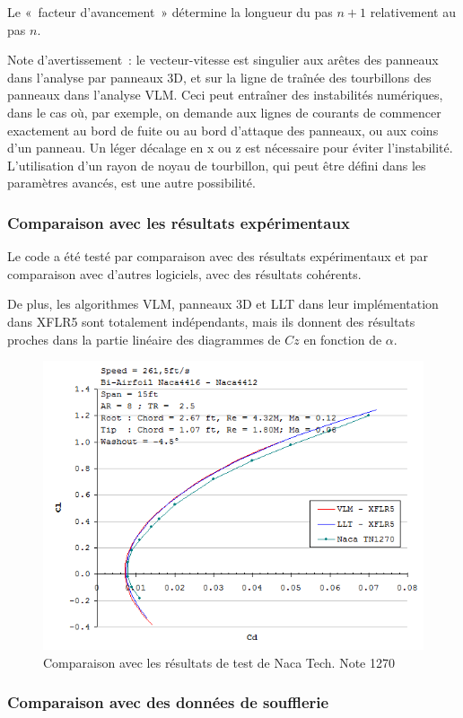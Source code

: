 \documentclass[a4paper,twoside,12pt,dvips]{article}
\begin{document}
Le «~facteur d’avancement~» détermine la longueur du pas $n+1$ relativement au pas $n$.

Note d’avertissement~: le vecteur-vitesse est singulier aux arêtes des panneaux dans l’analyse par panneaux 3D, et sur la ligne de traînée des tourbillons des panneaux dans l’analyse VLM. Ceci peut entraîner des instabilités numériques, dans le cas où, par exemple, on demande aux lignes de courants de commencer exactement au bord de fuite ou au bord  d’attaque des panneaux, ou aux coins d’un panneau. Un léger décalage en x ou z est nécessaire pour éviter l’instabilité. L’utilisation d’un rayon de noyau de tourbillon, qui peut être défini dans les paramètres avancés, est une autre possibilité.

\subsubsection{Comparaison avec les résultats expérimentaux}
Le code a été testé par comparaison avec des résultats expérimentaux et par 
comparaison avec d’autres logiciels, avec des résultats cohérents.

De plus, les algorithmes VLM, panneaux 3D et LLT dans leur implémentation
dans XFLR5 sont totalement indépendants, mais ils donnent des résultats
proches dans la partie linéaire des diagrammes de $Cz$ en fonction de $\alpha$.

\begin{figure}[htbp]
  \centering
  \includegraphics[width=0.8\linewidth]{img-36}
  \caption{Comparaison avec les résultats de test de Naca Tech. Note 1270}
  \label{img:comparaison_réesultats_tests}
\end{figure}

\subsubsection{Comparaison avec des données de soufflerie}
\end{document}
